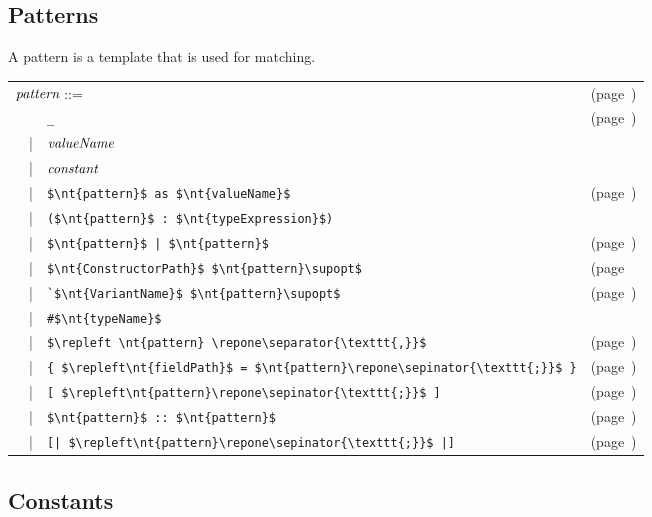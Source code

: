 \subsection{Patterns}

A pattern is a template that is used for matching.

\begin{center}
\begin{tabular}{rcll}
\multicolumn{3}{l}{$\textit{\rmfamily pattern}$ ::=} & (page~\pageref{keyword:match})\\
&   & \hbox{\lstinline/_/} & (page~\pageref{patterns:wildcard})\\
& | & $\textit{\rmfamily valueName}$\\
& | & $\textit{\rmfamily constant}$\\
& | & \hbox{\lstinline/$\nt{pattern}$ as $\nt{valueName}$/} & (page~\pageref{keyword:as(patterns)})\\
& | & \hbox{\lstinline/($\nt{pattern}$ : $\nt{typeExpression}$)/}\\
& | & \hbox{\lstinline/$\nt{pattern}$ | $\nt{pattern}$/} & (page~\pageref{patterns:choice})\\
& | & \hbox{\lstinline/$\nt{ConstructorPath}$ $\nt{pattern}\supopt$/} & (page~\pageref{constructor-patterns}\\
& | & \hbox{\lstinline/`$\nt{VariantName}$ $\nt{pattern}\supopt$/} & (page~\pageref{patterns:variants})\\
& | & \hbox{\lstinline/#$\nt{typeName}$/}\\
& | & \hbox{\lstinline/$\repleft \nt{pattern} \repone\separator{\texttt{,}}$/} & (page~\pageref{patterns:tuples})\\
& | & \hbox{\lstinline/{ $\repleft\nt{fieldPath}$ = $\nt{pattern}\repone\sepinator{\texttt{;}}$ }/} & (page~\pageref{patterns:record})\\
& | & \hbox{\lstinline/[ $\repleft\nt{pattern}\repone\sepinator{\texttt{;}}$ ]/} & (page~\pageref{patterns:lists})\\
& | & \hbox{\lstinline/$\nt{pattern}$ :: $\nt{pattern}$/} & (page~\pageref{patterns:lists})\\
& | & \hbox{\lstinline/[| $\repleft\nt{pattern}\repone\sepinator{\texttt{;}}$ |]/} & (page~\pageref{patterns:arrays})
\end{tabular}
\end{center}

\subsection{Constants}

